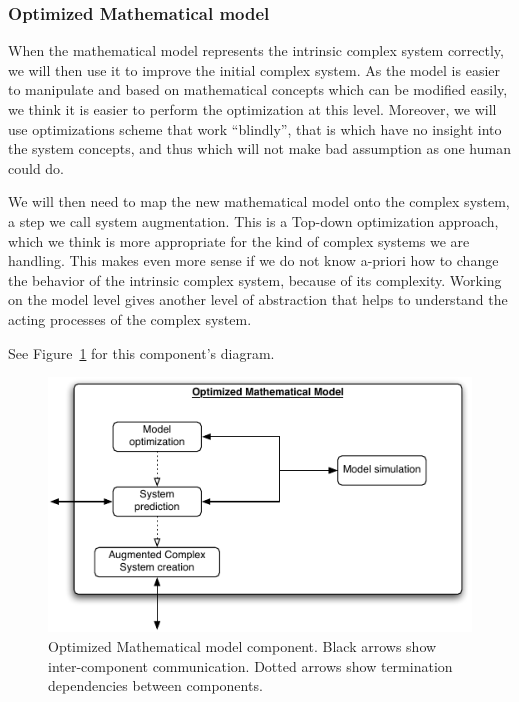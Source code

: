 \documentclass[letterpaper, oneside]{article}
\begin{document}

\subsubsection{Optimized Mathematical model} %
\label{ssub:optimized_mathematical_model}

When the mathematical model represents the intrinsic complex system correctly, we will then use it to improve the initial complex system. As the model is easier to manipulate and based on mathematical concepts which can be modified easily, we think it is easier to perform the optimization at this level. Moreover, we will use optimizations scheme that work ``blindly'', that is which have no insight into the system concepts, and thus which will not make bad assumption as one human could do.

We will then need to map the new mathematical model onto the complex system, a step we call system augmentation. This is a Top-down optimization approach, which we think is more appropriate for the kind of complex systems we are handling. This makes even more sense if we do not know a-priori how to change the behavior of the intrinsic complex system, because of its complexity. Working on the model level gives another level of abstraction that helps to understand the acting processes of the complex system.

See Figure~\ref{fig:img_optimized_mathematical_model} for this component's diagram. 

\begin{figure}[h!]
	\centering
		\includegraphics[width=12cm]{img/optimized_mathematical_model.pdf}
	\caption{Optimized Mathematical model component. Black arrows show inter-component communication. Dotted arrows show termination dependencies between components.}
	\label{fig:img_optimized_mathematical_model}
\end{figure}
\end{document}
